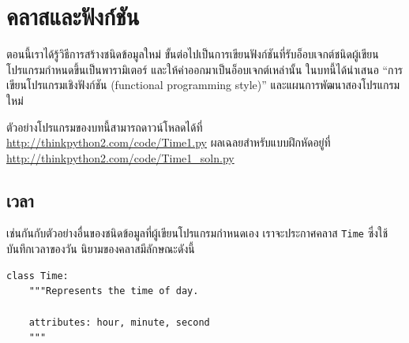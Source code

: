 \chapter{คลาสและฟังก์ชัน} %
\label{time}


ตอนนี้เราได้รู้วิธีการสร้างชนิดข้อมูลใหม่ ขั้นต่อไปเป็นการเขียนฟังก์ชันที่รับอ็อบเจกต์ชนิดผู้เขียนโปรแกรมกำหนดขึ้นเป็นพารามิเตอร์
และให้ค่าออกมาเป็นอ็อบเจกต์เหล่านั้น ในบทนี้ได้นำเสนอ ``การเขียนโปรแกรมเชิงฟังก์ชัน (functional programming style)'' และแผนการพัฒนาสองโปรแกรมใหม่



ตัวอย่างโปรแกรมของบทนี้สามารถดาวน์โหลดได้ที่ \url{http://thinkpython2.com/code/Time1.py}
ผลเฉลยสำหรับแบบฝึกหัดอยู่ที่ \url{http://thinkpython2.com/code/Time1_soln.py}

\section{เวลา} %
\label{isafter}

เช่นกันกับตัวอย่างอื่นของชนิดข้อมูลที่ผู้เขียนโปรแกรมกำหนดเอง เราจะประกาศคลาส {\tt Time} ซึ่งใช้บันทึกเวลาของวัน นิยามของคลาสมีลักษณะดังนี้

\begin{verbatim}
class Time:
    """Represents the time of day.
       
    attributes: hour, minute, second
    """
\end{verbatim}
%

